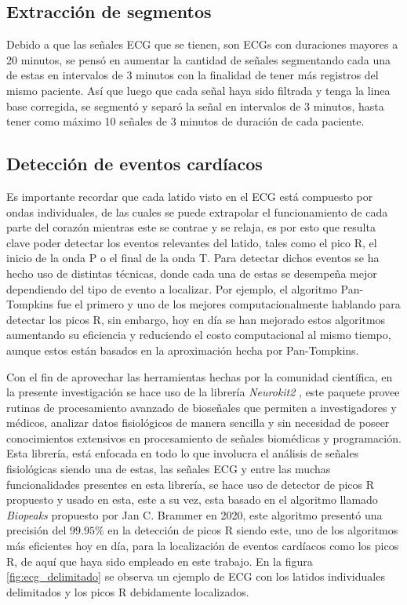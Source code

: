 \documentclass[12pt,letterpaper,oneside,openright]{book}
\begin{document}
\subsection{Extracción de segmentos}

Debido a que las señales ECG que se tienen, son ECGs con duraciones mayores a 20 minutos, se pensó en aumentar la cantidad de señales segmentando cada una de estas en intervalos de 3 minutos con la finalidad de tener más registros del mismo paciente. Así que luego que cada señal haya sido filtrada y tenga la linea base corregida, se segmentó y separó la señal en intervalos de 3 minutos, hasta tener como máximo 10 señales de 3 minutos de duración de cada paciente.

\subsection{Detección de eventos cardíacos}

Es importante recordar que cada latido visto en el ECG está compuesto por ondas individuales, de las cuales se puede extrapolar el funcionamiento de cada parte del corazón mientras este se contrae y se relaja, es por esto que resulta clave poder detectar los eventos relevantes del latido, tales como el pico R, el inicio de la onda P o el final de la onda T. Para detectar dichos eventos se ha hecho uso de distintas técnicas, donde cada una de estas se desempeña mejor dependiendo del tipo de evento a localizar. Por ejemplo, el algoritmo Pan-Tompkins \cite{PanTompkins85} fue el primero y uno de los mejores computacionalmente hablando para detectar los picos R, sin embargo, hoy en día se han mejorado estos algoritmos aumentando su eficiencia y reduciendo el costo computacional al mismo tiempo, aunque estos están basados en la aproximación hecha por Pan-Tompkins. 

Con el fin de aprovechar las herramientas hechas por la comunidad científica, en la presente investigación se hace uso de la librería \emph{Neurokit2} \cite{neurokit21}, este paquete provee rutinas de procesamiento avanzado de bioseñales que permiten a investigadores y médicos, analizar datos fisiológicos de manera sencilla y sin necesidad de poseer conocimientos extensivos en procesamiento de señales biomédicas y programación. Esta librería, está enfocada en todo lo que involucra el análisis de señales fisiológicas siendo una de estas, las señales ECG y entre las muchas funcionalidades presentes en esta librería, se hace uso de detector de picos R propuesto y usado en esta, este a su vez, esta basado en el algoritmo llamado \emph{Biopeaks} \cite{biopeaks_software20} propuesto por Jan C. Brammer en 2020, este algoritmo presentó una precisión del $99.95\%$ en la detección de picos R \cite{Biopeaks20} siendo este, uno de los algoritmos más eficientes hoy en día, para la localización de eventos cardíacos como los picos R, de aquí que haya sido empleado en este trabajo. En la figura \ref{fig:ecg_delimitado} se observa un ejemplo de ECG con los latidos individuales delimitados y los picos R debidamente localizados.
\end{document}
